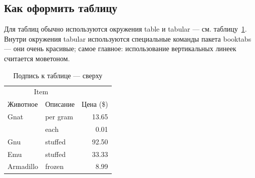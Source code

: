 \subsection{Как оформить таблицу}
Для таблиц обычно используются окружения table и tabular --- см. таблицу~\ref{tab:widgets}. Внутри окружения tabular используются специальные команды пакета booktabs — они очень красивые; самое главное: использование вертикальных линеек считается моветоном.
\begin{table}
\centering
\caption{\label{tab:widgets}Подпись к таблице --- сверху}
\begin{tabular}{llr}
\toprule
\multicolumn{2}{c}{Item} \\
\cmidrule(r){1-2}
Животное  & Описание    & Цена (\$) \\
\midrule
Gnat      & per gram    & 13.65      \\
          & each        & 0.01       \\
Gnu       & stuffed     & 92.50      \\
Emu       & stuffed     & 33.33      \\
Armadillo & frozen      & 8.99       \\
\bottomrule
\end{tabular}
\end{table}

\fi



